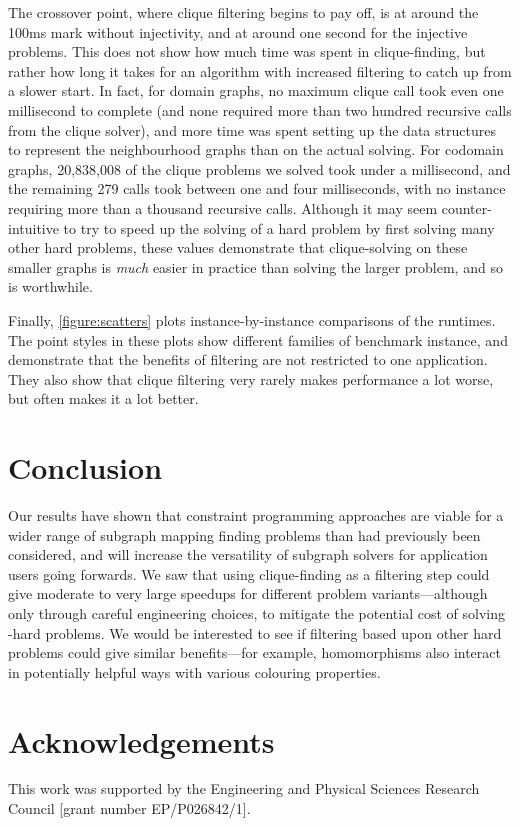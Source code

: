 \documentclass{article}
\begin{document}
The crossover point, where clique filtering begins to pay off, is at around the 100ms mark without
injectivity, and at around one second for the injective problems. This does not show how much time
was spent in clique-finding, but rather how long it takes for an algorithm with increased
filtering to catch up from a slower start. In fact, for domain graphs, no maximum clique call took
even one millisecond to complete (and none required more than two hundred recursive calls from the
clique solver), and more time was spent setting up the data structures to represent the
neighbourhood graphs than on the actual solving. For codomain graphs, 20,838,008 of the clique
problems we solved took under a millisecond, and the remaining 279 calls took between one and four
milliseconds, with no instance requiring more than a thousand recursive calls.  Although it may seem
counter-intuitive to try to speed up the solving of a hard problem by first solving many other hard
problems, these values demonstrate that clique-solving on these smaller graphs is \emph{much} easier
in practice than solving the larger problem, and so is worthwhile.

Finally, \cref{figure:scatters} plots instance-by-instance comparisons of the runtimes. The
point styles in these plots show different families of benchmark instance, and demonstrate
that the benefits of filtering are not restricted to one application. They also show that clique
filtering very rarely makes performance a lot worse, but often makes it a lot better.

\section{Conclusion}

Our results have shown that constraint programming approaches are viable for a wider range of subgraph
mapping finding problems than had previously been considered, and will increase the versatility of
subgraph solvers for application users going forwards. We saw that using clique-finding as a
filtering step could give moderate to very large speedups for different problem variants---although
only through careful engineering choices, to mitigate the potential cost of solving \NP-hard
problems. We would be interested to see if filtering based upon other hard problems could give
similar benefits---for example, homomorphisms also interact in potentially helpful ways with various
colouring properties.

\section*{Acknowledgements}

This work was supported by the Engineering and Physical Sciences Research Council [grant number
EP/P026842/1].



\end{document}
